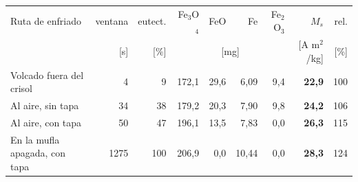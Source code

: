 \begin{tabular}{lrrrrrrrr}
    \hline
    Ruta de enfriado & ventana & eutect. & Fe$_3$O$_4$ & FeO & Fe & Fe$_2$O$_3$ & $M_s$ & rel. \\
     & [s] & [\%] & \multicolumn{4}{c}{[mg]} & [A m$^2$/kg] & [\%] \\
    \hline
    Volcado fuera del crisol & 4 & 9 & 172,1 & 29,6 & 6,09 & 9,4 & \textbf{22,9} & 100 \\
    Al aire, sin tapa & 34 & 38 & 179,2 & 20,3 & 7,90 & 9,8 & \textbf{24,2} & 106 \\
    Al aire, con tapa & 50 & 47 & 196,1 & 13,5 & 7,83 & 0,0 & \textbf{26,3} & 115 \\
    En la mufla apagada, con tapa & 1275 & 100 & 206,9 & 0,0 & 10,44 & 0,0 & \textbf{28,3} & 124 \\
    \hline
\end{tabular}
